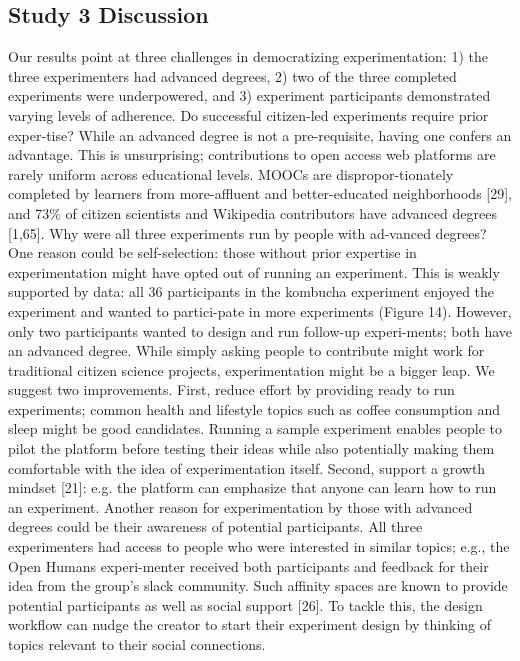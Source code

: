 \subsection{Study 3 Discussion}
Our results point at three challenges in democratizing experimentation: 1) the three experimenters had advanced degrees, 2) two of the three completed experiments were underpowered, and 3) experiment participants demonstrated varying levels of adherence. 
Do successful citizen-led experiments require prior exper-tise? While an advanced degree is not a pre-requisite, having one confers an advantage. This is unsurprising; contributions to open access web platforms are rarely uniform across educational levels. MOOCs are dispropor-tionately completed by learners from more-affluent and better-educated neighborhoods [29], and 73\% of citizen scientists and Wikipedia contributors have advanced degrees [1,65]. 
Why were all three experiments run by people with ad-vanced degrees? One reason could be self-selection: those without prior expertise in experimentation might have opted out of running an experiment. This is weakly supported by data: all 36 participants in the kombucha experiment enjoyed the experiment and wanted to partici-pate in more experiments (Figure 14). However, only two participants wanted to design and run follow-up experi-ments; both have an advanced degree. While simply asking people to contribute might work for traditional citizen science projects, experimentation might be a bigger leap. We suggest two improvements. First, reduce effort by providing ready to run experiments; common health and lifestyle topics such as coffee consumption and sleep might be good candidates. Running a sample experiment enables people to pilot the platform before testing their ideas while also potentially making them comfortable with the idea of experimentation itself. Second, support a growth mindset [21]: e.g. the platform can emphasize that anyone can learn how to run an experiment.
Another reason for experimentation by those with advanced degrees could be their awareness of potential participants. All three experimenters had access to people who were interested in similar topics; e.g., the Open Humans experi-menter received both participants and feedback for their idea from the group’s slack community. Such affinity spaces are known to provide potential participants as well as social support [26]. To tackle this, the design workflow can nudge the creator to start their experiment design by thinking of topics relevant to their social connections.

